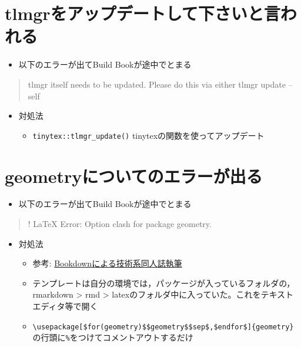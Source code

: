 \documentclass[xelatex, ja=standard, b5paper]{bxjsbook}
\providecommand{\tightlist}{%
  \setlength{\itemsep}{0pt}\setlength{\parskip}{0pt}}
\begin{document}
\hypertarget{error_tlmgr}{%
\section{tlmgrをアップデートして下さいと言われる}\label{error_tlmgr}}

\begin{itemize}
\tightlist
\item
  以下のエラーが出てBuild Bookが途中でとまる
\end{itemize}

\begin{quote}
tlmgr itself needs to be updated.
Please do this via either
tlmgr update --self
\end{quote}

\begin{itemize}
\tightlist
\item
  対処法

  \begin{itemize}
  \tightlist
  \item
    \texttt{tinytex::tlmgr\_update()} tinytexの関数を使ってアップデート
  \end{itemize}
\end{itemize}

\hypertarget{error_pandoc}{%
\section{geometryについてのエラーが出る}\label{error_pandoc}}

\begin{itemize}
\tightlist
\item
  以下のエラーが出てBuild Bookが途中でとまる
\end{itemize}

\begin{quote}
! LaTeX Error: Option clash for package geometry.
\end{quote}

\begin{itemize}
\tightlist
\item
  対処法

  \begin{itemize}
  \tightlist
  \item
    参考: \href{https://teastat.blogspot.com/2019/01/bookdown.html}{Bookdownによる技術系同人誌執筆}
  \item
    テンプレートは自分の環境では，パッケージが入っているフォルダの，rmarkdown \textgreater{} rmd \textgreater{} latexのフォルダ中に入っていた。これをテキストエディタ等で開く
  \item
    \texttt{\textbackslash{}usepackage{[}\$for(geometry)\$\$geometry\$\$sep\$,\$endfor\${]}\{geometry\}}の行頭に\texttt{\%}をつけてコメントアウトするだけ
  \end{itemize}
\end{itemize}
\end{document}
